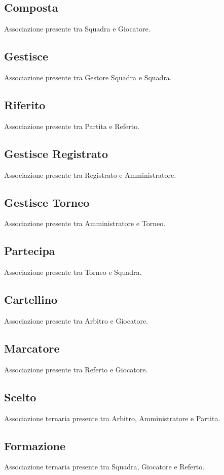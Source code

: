 	\subsection{Composta}
	Associazione presente tra Squadra e Giocatore.
	
	\subsection{Gestisce}
	Associazione presente tra Gestore Squadra e Squadra.
	
	\subsection{Riferito}
	Associazione presente tra Partita e Referto.
	
	\subsection{Gestisce Registrato}
	Associazione presente tra Registrato e Amministratore.
	
	\subsection{Gestisce Torneo}
	Associazione presente tra Amministratore e Torneo.
	
	\subsection{Partecipa}
	Associazione presente tra Torneo e Squadra.
	
	\subsection{Cartellino}
	Associazione presente tra Arbitro e Giocatore.
	
	\subsection{Marcatore}
	Associazione presente tra Referto e Giocatore.
	
	\subsection{Scelto}
	Associazione ternaria presente tra Arbitro, Amministratore e Partita.
	
	\subsection{Formazione}
	Associazione ternaria presente tra Squadra, Giocatore e Referto.
	
